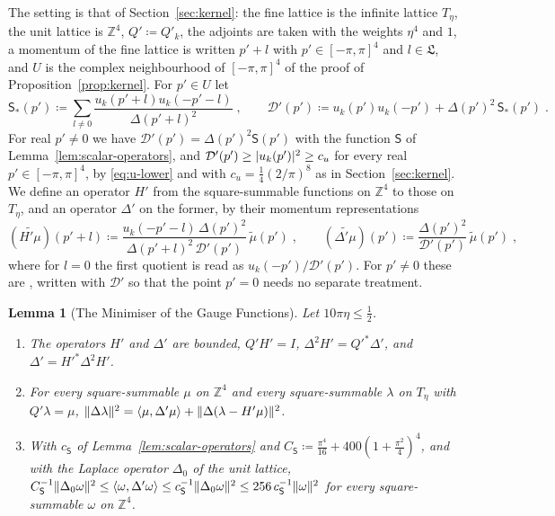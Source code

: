 \documentclass[11pt]{preprint}
\DeclarePairedDelimiter{\abs}{\lvert}{\rvert}
\DeclarePairedDelimiter{\norm}{\lVert}{\rVert}
\numberwithin{equation}{section}
\newtheorem{lemma}[theorem]{Lemma}
\theoremstyle{definition}
\theoremstyle{remark}
\theoremstyle{plain}
\begin{document}
The setting is that of Section~\ref{sec:kernel}: the fine lattice is the infinite lattice $T_\eta$, the unit lattice is $\mathbb Z^4$, $Q' \coloneqq Q'_k$, the adjoints are taken with the weights $\eta^4$ and $1$, a momentum of the fine lattice is written $p' + l$ with $p' \in [-\pi, \pi]^4$ and $l \in \mathfrak L$, and $U$ is the complex neighbourhood of $[-\pi, \pi]^4$ of the proof of Proposition~\ref{prop:kernel}. For $p' \in U$ let
\begin{equation}\label{eq:gauge-denominator}
    \mathsf S_*(p') \coloneqq \sum_{l \neq 0}\frac{u_k(p' + l)u_k(-p' - l)}{\Delta(p' + l)^2}\;,
    \qquad
    \mathcal D'(p') \coloneqq u_k(p')u_k(-p') + \Delta(p')^2\,\mathsf S_*(p')\;.
\end{equation}
For real $p' \neq 0$ we have $\mathcal D'(p') = \Delta(p')^2\mathsf S(p')$ with the function $\mathsf S$ of Lemma~\ref{lem:scalar-operators}, and $\mathcal D'(p') \geq \abs{u_k(p')}^2 \geq c_u$ for every real $p' \in [-\pi, \pi]^4$, by \eqref{eq:u-lower} and with $c_u = \frac14(2/\pi)^8$ as in Section~\ref{sec:kernel}. We define an operator $H'$ from the square-summable functions on $\mathbb Z^4$ to those on $T_\eta$, and an operator $\Delta'$ on the former, by their momentum representations
\begin{equation}\label{eq:gauge-operators}
    (\widetilde{H'\mu})(p' + l) \coloneqq \frac{u_k(-p' - l)\,\Delta(p')^2}{\Delta(p' + l)^2\,\mathcal D'(p')}\,\tilde\mu(p')\;,
    \qquad
    (\widetilde{\Delta'\mu})(p') \coloneqq \frac{\Delta(p')^2}{\mathcal D'(p')}\,\tilde\mu(p')\;,
\end{equation}
where for $l = 0$ the first quotient is read as $u_k(-p')/\mathcal D'(p')$. For $p' \neq 0$ these are \cite[(2.132), (2.108)]{BalabanPRT2}, written with $\mathcal D'$ so that the point $p' = 0$ needs no separate treatment.

\begin{lemma}[The Minimiser of the Gauge Functions]\label{lem:gauge-minimiser}
Let $10\pi\eta \leq \frac12$.
\begin{enumerate}[label=(\roman*)]
\item The operators $H'$ and $\Delta'$ are bounded, $Q'H' = I$, $\Delta^2H' = Q'^*\Delta'$, and $\Delta' = H'^*\Delta^2H'$.
\item For every square-summable $\mu$ on $\mathbb Z^4$ and every square-summable $\lambda$ on $T_\eta$ with $Q'\lambda = \mu$, $\norm{\Delta\lambda}^2 = \langle\mu, \Delta'\mu\rangle + \norm{\Delta(\lambda - H'\mu)}^2$.
\item With $c_{\mathsf S}$ of Lemma~\ref{lem:scalar-operators} and $C_{\mathsf S} \coloneqq \frac{\pi^4}{16} + 400(1 + \frac{\pi^2}{4})^4$, and with the Laplace operator $\Delta_0$ of the unit lattice, $C_{\mathsf S}^{-1}\norm{\Delta_0\omega}^2 \leq \langle\omega, \Delta'\omega\rangle \leq c_{\mathsf S}^{-1}\norm{\Delta_0\omega}^2 \leq 256\,c_{\mathsf S}^{-1}\norm\omega^2$ for every square-summable $\omega$ on $\mathbb Z^4$.
\end{enumerate}
\end{lemma}
\end{document}

